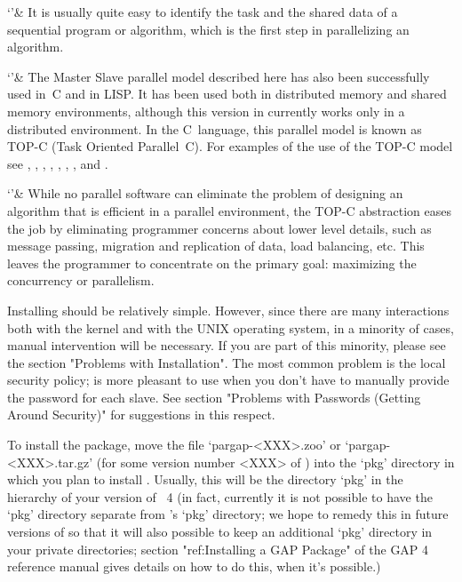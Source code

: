`'& It is usually quite easy to identify the task and the shared data  of
    a sequential program  or  algorithm,  which  is  the  first  step  in
    parallelizing an algorithm.

`'& The  Master  Slave  parallel  model  described  here  has  also  been
    successfully used in~C  and  in  LISP.  It  has  been  used  both  in
    distributed memory and  shared  memory  environments,  although  this
    version in {\GAP} currently works only in a distributed  environment.
    In the C~language, this  parallel  model  is  known  as  TOP-C  (Task
    Oriented Parallel~C). For examples of the use of the TOP-C model  see
    \cite{Coo98},     \cite{CCHW02},      \cite{CFTY94},     \cite{CG02},
    \cite{CH97}, \cite{CHLM97}, \cite{CLMW96}, and \cite{CT96}.

`'& While no parallel software can eliminate the problem of designing  an
    algorithm that is efficient in  a  parallel  environment,  the  TOP-C
    abstraction eases the job by eliminating  programmer  concerns  about
    lower  level  details,  such  as  message  passing,   migration   and
    replication of data, load balancing, etc. This leaves the  programmer
    to concentrate on the primary goal:  maximizing  the  concurrency  or
    parallelism.

\enditems


Installing {\ParGAP} should be relatively simple.  However,  since  there
are many interactions both with the  {\GAP}  kernel  and  with  the  UNIX
operating system, in a minority of cases,  manual  intervention  will  be
necessary. If you are part of  this  minority,  please  see  the  section
"Problems with Installation".  The  most  common  problem  is  the  local
security policy; {\ParGAP} is more pleasant to use when you don't have to
manually provide the password for each slave. See section "Problems  with
Passwords (Getting Around Security)" for suggestions in this respect.

To install the {\ParGAP} package, move  the  file  `pargap-<XXX>.zoo'  or
`pargap-<XXX>.tar.gz' (for some version number <XXX> of  {\ParGAP})  into
the `pkg' directory in which you plan to install {\ParGAP}. Usually, this
will be the directory `pkg' in the hierarchy of your version of  {\GAP}~4
(in fact, currently it is  not  possible  to  have  the  `pkg'  directory
separate from {\GAP}'s `pkg' directory; we hope to remedy this in  future
versions of {\ParGAP} so that it will also possible to keep an additional
`pkg' directory in your private directories; section "ref:Installing a GAP Package" 
of the GAP 4 reference manual gives details on how to do  this,
when it's possible.)

